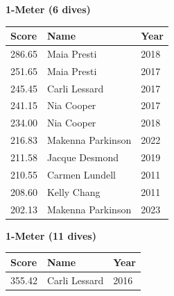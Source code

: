 \vspace{1.2em}
\noindent\begin{minipage}[t]{0.48\textwidth}
\centering
\textbf{\textcolor{teamprimary}{1-Meter (6 dives)}}\par
\vspace{0.5em}
\centering
\small
\renewcommand{\arraystretch}{1.0}
\setlength{\tabcolsep}{4pt}
\begin{tabular}{@{}p{1.8cm}p{3.0cm}p{1.0cm}@{}}
\toprule
\textbf{Score} & \textbf{Name} & \textbf{Year} \\
\midrule
286.65 & Maia Presti & 2018 \\
251.65 & Maia Presti & 2017 \\
245.45 & Carli Lessard & 2017 \\
241.15 & Nia Cooper & 2017 \\
234.00 & Nia Cooper & 2018 \\
216.83 & Makenna Parkinson & 2022 \\
211.58 & Jacque Desmond & 2019 \\
210.55 & Carmen Lundell & 2011 \\
208.60 & Kelly Chang & 2011 \\
202.13 & Makenna Parkinson & 2023 \\
\bottomrule
\end{tabular}
\end{minipage}
\hfill
\begin{minipage}[t]{0.48\textwidth}
\centering
\textbf{\textcolor{teamprimary}{1-Meter (11 dives)}}\par
\vspace{0.5em}
\centering
\small
\renewcommand{\arraystretch}{1.0}
\setlength{\tabcolsep}{4pt}
\begin{tabular}{@{}p{1.8cm}p{3.0cm}p{1.0cm}@{}}
\toprule
\textbf{Score} & \textbf{Name} & \textbf{Year} \\
\midrule
355.42 & Carli Lessard & 2016 \\
\bottomrule
\end{tabular}
\end{minipage}
\vspace{1.2em}
